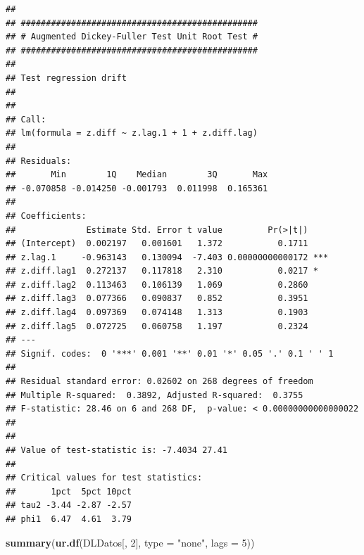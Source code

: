 \documentclass[
]{book}
\newenvironment{Shaded}{\begin{snugshade}}{\end{snugshade}}
\newcommand{\AttributeTok}[1]{\textcolor[rgb]{0.13,0.29,0.53}{#1}}
\newcommand{\DecValTok}[1]{\textcolor[rgb]{0.00,0.00,0.81}{#1}}
\newcommand{\FunctionTok}[1]{\textcolor[rgb]{0.13,0.29,0.53}{\textbf{#1}}}
\newcommand{\NormalTok}[1]{#1}
\newcommand{\StringTok}[1]{\textcolor[rgb]{0.31,0.60,0.02}{#1}}
\begin{document}
\begin{verbatim}
## 
## ############################################### 
## # Augmented Dickey-Fuller Test Unit Root Test # 
## ############################################### 
## 
## Test regression drift 
## 
## 
## Call:
## lm(formula = z.diff ~ z.lag.1 + 1 + z.diff.lag)
## 
## Residuals:
##       Min        1Q    Median        3Q       Max 
## -0.070858 -0.014250 -0.001793  0.011998  0.165361 
## 
## Coefficients:
##              Estimate Std. Error t value         Pr(>|t|)    
## (Intercept)  0.002197   0.001601   1.372           0.1711    
## z.lag.1     -0.963143   0.130094  -7.403 0.00000000000172 ***
## z.diff.lag1  0.272137   0.117818   2.310           0.0217 *  
## z.diff.lag2  0.113463   0.106139   1.069           0.2860    
## z.diff.lag3  0.077366   0.090837   0.852           0.3951    
## z.diff.lag4  0.097369   0.074148   1.313           0.1903    
## z.diff.lag5  0.072725   0.060758   1.197           0.2324    
## ---
## Signif. codes:  0 '***' 0.001 '**' 0.01 '*' 0.05 '.' 0.1 ' ' 1
## 
## Residual standard error: 0.02602 on 268 degrees of freedom
## Multiple R-squared:  0.3892, Adjusted R-squared:  0.3755 
## F-statistic: 28.46 on 6 and 268 DF,  p-value: < 0.00000000000000022
## 
## 
## Value of test-statistic is: -7.4034 27.41 
## 
## Critical values for test statistics: 
##       1pct  5pct 10pct
## tau2 -3.44 -2.87 -2.57
## phi1  6.47  4.61  3.79
\end{verbatim}

\begin{Shaded}
\begin{Highlighting}[]
\FunctionTok{summary}\NormalTok{(}\FunctionTok{ur.df}\NormalTok{(DLDatos[, }\DecValTok{2}\NormalTok{], }\AttributeTok{type =} \StringTok{"none"}\NormalTok{, }\AttributeTok{lags =} \DecValTok{5}\NormalTok{))}
\end{Highlighting}
\end{Shaded}
\end{document}
